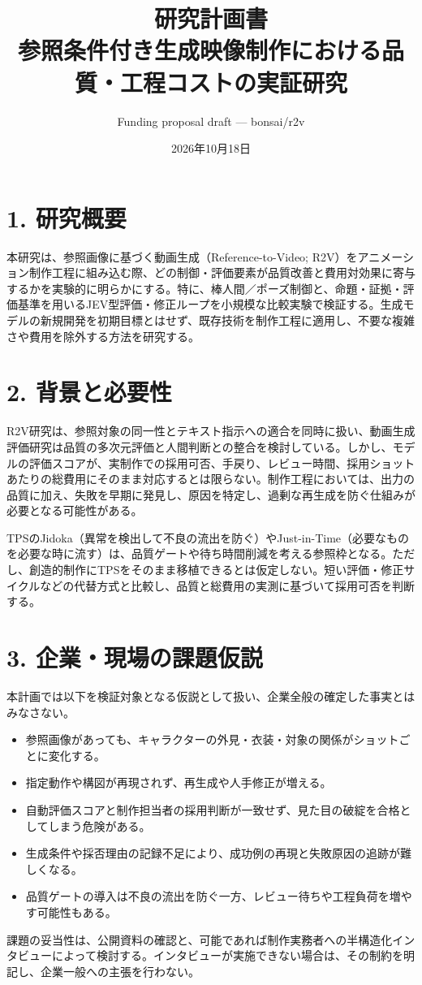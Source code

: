 \documentclass[11pt,a4paper]{article}
\title{研究計画書\\
\large 参照条件付き生成映像制作における品質・工程コストの実証研究}
\author{Funding proposal draft --- bonsai/r2v}
\date{2026年10月18日}
\begin{document}
\maketitle

\section*{1. 研究概要}
本研究は、参照画像に基づく動画生成（Reference-to-Video; R2V）をアニメーション制作工程に組み込む際、どの制御・評価要素が品質改善と費用対効果に寄与するかを実験的に明らかにする。特に、棒人間／ポーズ制御と、命題・証拠・評価基準を用いるJEV型評価・修正ループを小規模な比較実験で検証する。生成モデルの新規開発を初期目標とはせず、既存技術を制作工程に適用し、不要な複雑さや費用を除外する方法を研究する。

\section*{2. 背景と必要性}
R2V研究は、参照対象の同一性とテキスト指示への適合を同時に扱い、動画生成評価研究は品質の多次元評価と人間判断との整合を検討している。しかし、モデルの評価スコアが、実制作での採用可否、手戻り、レビュー時間、採用ショットあたりの総費用にそのまま対応するとは限らない。制作工程においては、出力の品質に加え、失敗を早期に発見し、原因を特定し、過剰な再生成を防ぐ仕組みが必要となる可能性がある。

TPSのJidoka（異常を検出して不良の流出を防ぐ）やJust-in-Time（必要なものを必要な時に流す）は、品質ゲートや待ち時間削減を考える参照枠となる。ただし、創造的制作にTPSをそのまま移植できるとは仮定しない。短い評価・修正サイクルなどの代替方式と比較し、品質と総費用の実測に基づいて採用可否を判断する。

\section*{3. 企業・現場の課題仮説}
本計画では以下を検証対象となる仮説として扱い、企業全般の確定した事実とはみなさない。
\begin{itemize}[nosep]
\item 参照画像があっても、キャラクターの外見・衣装・対象の関係がショットごとに変化する。
\item 指定動作や構図が再現されず、再生成や人手修正が増える。
\item 自動評価スコアと制作担当者の採用判断が一致せず、見た目の破綻を合格としてしまう危険がある。
\item 生成条件や採否理由の記録不足により、成功例の再現と失敗原因の追跡が難しくなる。
\item 品質ゲートの導入は不良の流出を防ぐ一方、レビュー待ちや工程負荷を増やす可能性もある。
\end{itemize}
課題の妥当性は、公開資料の確認と、可能であれば制作実務者への半構造化インタビューによって検討する。インタビューが実施できない場合は、その制約を明記し、企業一般への主張を行わない。
\end{document}
